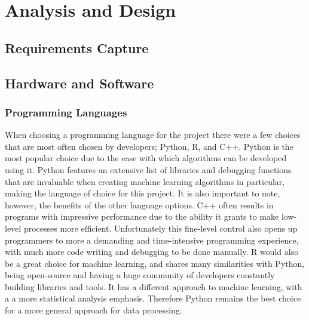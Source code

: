 \chapter{Analysis and Design} \label{chap:analysis_and_design}

\section{Requirements Capture}


\section{Hardware and Software}

\subsection{Programming Languages}

When choosing a programming language for the project there were a few choices that are most often chosen by developers; Python\cite{Python}, R\cite{R}, and C++\cite{C++}. Python is the most popular choice due to the ease with which algorithms can be developed using it. Python features an extensive list of libraries and debugging functions that are invaluable when creating machine learning algorithms in particular, making the language of choice for this project. It is also important to note, however, the benefits of the other language options. C++ often results in programs with impressive performance due to the ability it grants to make low-level processes more efficient. Unfortunately this fine-level control also opens up programmers to more a demanding and time-intensive programming experience, with much more code writing and debugging to be done manually. R would also be a great choice for machine learning, and shares many similarities with Python, being open-source and having a huge community of developers constantly building libraries and tools. It has a different approach to machine learning, with a a more statistical analysis emphasis. Therefore Python remains the best choice for a more general approach for data processing.

